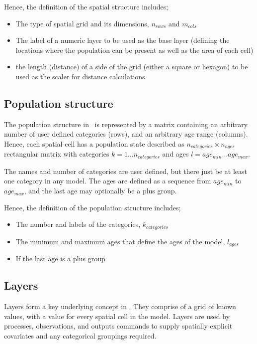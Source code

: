 Hence, the definition of the spatial structure includes;
\begin{itemize}
\item The type of spatial grid and its dimensions, $n_{rows}$ and $m_{cols}$
\item The label of a numeric layer to be used as the base layer (defining the locations where the population can be present as well as the area of each cell)
\item the length (distance) of a side of the grid (either a square or hexagon) to be used as the scaler for distance calculations
\end{itemize}

\subsection{Population structure}

The population structure in \SPM\ is represented by a matrix containing an arbitrary number of user defined categories (rows), and an arbitrary age range (columns). Hence, each spatial cell has a population state described as $n_{categories} \times n_{ages}$ rectangular matrix with categories $k=1 \ldots n_{categories}$ and ages $l=age_{min} \ldots age_{max}$. 

The names and number of categories are user defined, but there  just be at least one category in any model. The ages are defined as a sequence from $age_{min}$ to $age_{max}$, and the last age may optionally be a plus group.

Hence, the definition of the population structure includes;
\begin{itemize}
  \item The number and labels of the categories, $k_{categories}$
  \item The minimum and maximum ages that define the ages of the model, $l_{ages}$
  \item If the last age is a plus group
\end{itemize}

\subsection{Layers\label{sec:layers}}

Layers form a key underlying concept in \SPM. They comprise of a grid of known values, with a value for every spatial cell in the model. Layers are used by processes, observations, and outputs commands to supply spatially explicit covariates and any categorical groupings required. 


